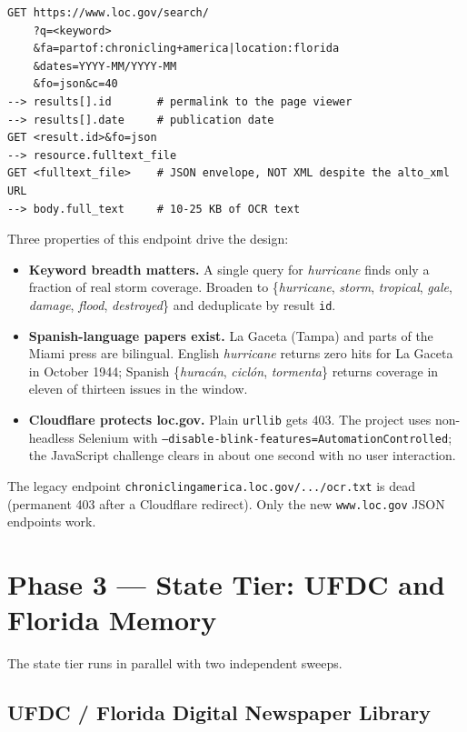\documentclass[11pt,letterpaper]{article}
\begin{document}
\begin{lstlisting}[caption={LOC Chronicling America query pattern},label=lst:loc]
GET https://www.loc.gov/search/
    ?q=<keyword>
    &fa=partof:chronicling+america|location:florida
    &dates=YYYY-MM/YYYY-MM
    &fo=json&c=40
--> results[].id       # permalink to the page viewer
--> results[].date     # publication date
GET <result.id>&fo=json
--> resource.fulltext_file
GET <fulltext_file>    # JSON envelope, NOT XML despite the alto_xml URL
--> body.full_text     # 10-25 KB of OCR text
\end{lstlisting}

Three properties of this endpoint drive the design:

\begin{itemize}
  \item \textbf{Keyword breadth matters.} A single query for \emph{hurricane} finds only a fraction of real storm coverage. Broaden to \{\emph{hurricane}, \emph{storm}, \emph{tropical}, \emph{gale}, \emph{damage}, \emph{flood}, \emph{destroyed}\} and deduplicate by result \texttt{id}.
  \item \textbf{Spanish-language papers exist.} La Gaceta (Tampa) and parts of the Miami press are bilingual. English \emph{hurricane} returns zero hits for La Gaceta in October 1944; Spanish \{\emph{hurac\'an}, \emph{cicl\'on}, \emph{tormenta}\} returns coverage in eleven of thirteen issues in the window.
  \item \textbf{Cloudflare protects loc.gov.} Plain \texttt{urllib} gets 403. The project uses non-headless Selenium with \texttt{--disable-blink-features=AutomationControlled}; the JavaScript challenge clears in about one second with no user interaction.
\end{itemize}

The legacy endpoint \texttt{chroniclingamerica.loc.gov/.../ocr.txt} is dead (permanent 403 after a Cloudflare redirect). Only the new \texttt{www.loc.gov} JSON endpoints work.

\section{Phase 3 --- State Tier: UFDC and Florida Memory}

The state tier runs in parallel with two independent sweeps.

\subsection{UFDC / Florida Digital Newspaper Library}
\end{document}
